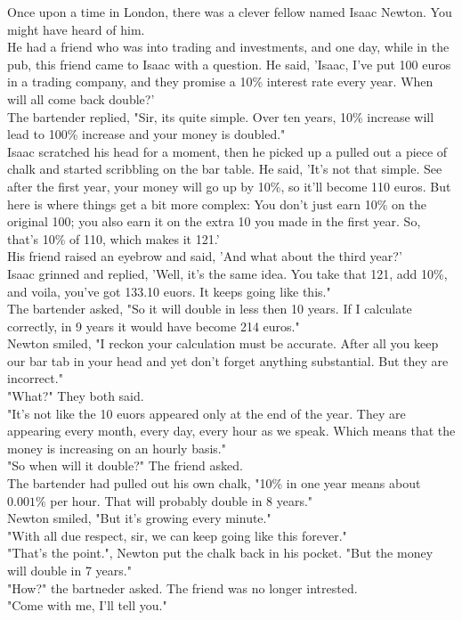 
Once upon a time in London, there was a clever fellow named Isaac Newton. You might have heard of him. \\
He had a friend who was into trading and investments, and one day, while in the pub, this friend came to Isaac with a question. He said, 'Isaac, I've put 100 euros in a trading company, and they promise a 10\% interest rate every year. When will all come back double?'\\
The bartender replied, "Sir, its quite simple. Over ten years, 10\% increase will lead to 100\% increase and your money is doubled."\\
Isaac scratched his head for a moment, then he picked up a pulled out a piece of chalk and started scribbling on the bar table. He said, 'It's not that simple. See after the first year, your money will go up by 10\%, so it'll become 110 euros. But here is where things get a bit more complex: You don't just earn 10\% on the original 100; you also earn it on the extra 10 you made in the first year. So, that's 10\% of 110, which makes it 121.'\\
His friend raised an eyebrow and said, 'And what about the third year?'\\
Isaac grinned and replied, 'Well, it's the same idea. You take that 121, add 10\%, and voila, you've got 133.10 euors. It keeps going like this."\\
The bartender asked, "So it will double in less then 10 years. If I calculate correctly, in 9 years it would have become 214 euros."\\
Newton smiled, "I reckon your calculation must be accurate. After all you keep our bar tab in your head and yet don't forget anything substantial. But they are incorrect."\\
"What?" They both said.\\
"It's not like the 10 euors appeared only at the end of the year. They are appearing every month, every day, every hour as we speak. Which means that the money is increasing on an hourly basis."\\
"So when will it double?" The friend asked.\\
The bartender had pulled out his own chalk, "10\% in one year means about $0.001\%$ per hour. That will probably double in 8 years."\\
Newton smiled, "But it's growing every minute."\\
"With all due respect, sir, we can keep going like this forever."\\
"That's the point.", Newton put the chalk back in his pocket. "But the money will double in 7 years."\\
"How?" the bartneder asked. The friend was no longer intrested.\\
"Come with me, I'll tell you."\\

